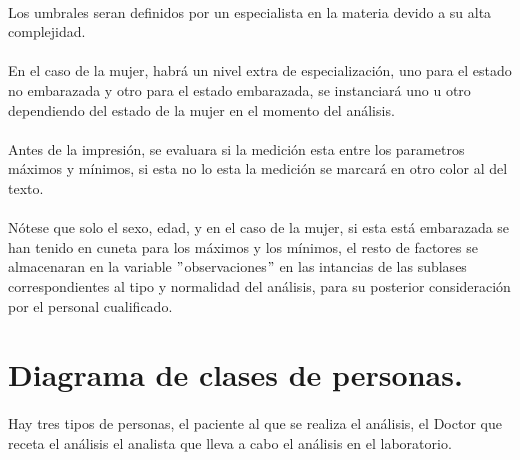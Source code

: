 \documentclass[a4paper,10pt]{article}
\begin{document}
\paragraph{}
Los umbrales seran definidos por un especialista en la materia devido a su alta complejidad.
\paragraph{}
En el caso de la mujer, habrá un nivel extra de especialización, uno para el estado no embarazada y otro para el estado embarazada, se instanciará uno u otro dependiendo del estado de la mujer en el momento del análisis.
\paragraph{}
Antes de la impresión, se evaluara si la medición esta entre los parametros máximos y mínimos, si esta no lo esta la medición se marcará en otro color al del texto.
\paragraph{}
Nótese que solo el sexo, edad, y en el caso de la mujer, si esta está embarazada se han tenido en cuneta para los máximos y los mínimos, el resto de factores se almacenaran en la variable $"$observaciones$"$ en las intancias de las sublases correspondientes al tipo y normalidad del análisis, para su posterior consideración por el personal cualificado.
\pagebreak

\section{Diagrama de clases de personas.}
\paragraph{}
Hay tres tipos de personas, el paciente al que se realiza el análisis, el Doctor que receta el análisis el analista que lleva a cabo el análisis en el laboratorio.
\end{document}
